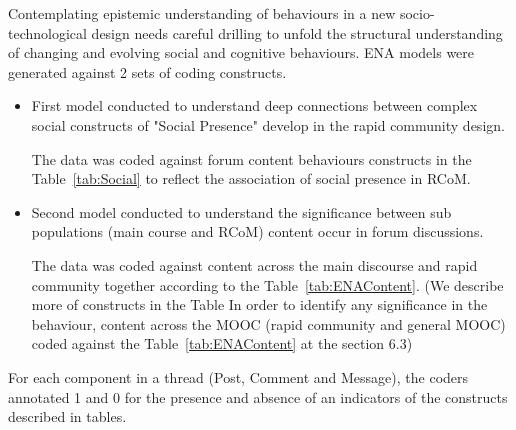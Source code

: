 \documentclass[format=acmsmall, review=false, screen=true]{acmart}
\begin{document}
Contemplating epistemic understanding of behaviours in a new socio-technological design needs careful drilling to unfold the structural understanding of changing and evolving social and cognitive behaviours. ENA models were generated against 2 sets of coding constructs. 
\begin{itemize}
 \item First model conducted to understand deep connections between complex social constructs of "Social Presence" develop in the rapid community design. 
 
 The data was coded against forum content behaviours constructs in the Table~\ref{tab:Social} to reflect the association of social presence in RCoM.
 
 
 \item Second model conducted to understand the significance between sub populations (main course and RCoM) content occur in forum discussions. 
 
 The data was coded against content across the main discourse and rapid community together according to the Table~\ref{tab:ENAContent}. (We describe more of constructs in the Table In order to identify any significance in the behaviour, content across the MOOC (rapid community and general MOOC) coded against the Table~\ref{tab:ENAContent} at the section 6.3)
 
\end{itemize} 

For each component in a thread (Post, Comment and Message), the coders annotated 1 and 0 for the presence and absence of an indicators of the constructs described in tables. 
\end{document}
